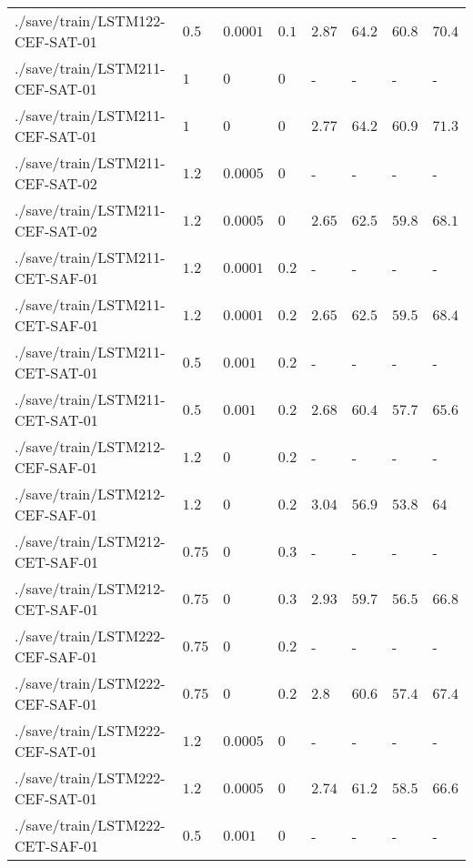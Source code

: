 \begin{table}[tbp]
\begin{tabular}{llllllll}
./save/train/LSTM122-CEF-SAT-01 & $0.5$ & $0.0001$ & $0.1$ & $2.87$ & $64.2$ & $60.8$ & $70.4$ \\
./save/train/LSTM211-CEF-SAT-01 & $1$ & $0$ & $0$ & - & - & - & - \\
./save/train/LSTM211-CEF-SAT-01 & $1$ & $0$ & $0$ & $2.77$ & $64.2$ & $60.9$ & $71.3$ \\
./save/train/LSTM211-CEF-SAT-02 & $1.2$ & $0.0005$ & $0$ & - & - & - & - \\
./save/train/LSTM211-CEF-SAT-02 & $1.2$ & $0.0005$ & $0$ & $2.65$ & $62.5$ & $59.8$ & $68.1$ \\
./save/train/LSTM211-CET-SAF-01 & $1.2$ & $0.0001$ & $0.2$ & - & - & - & - \\
./save/train/LSTM211-CET-SAF-01 & $1.2$ & $0.0001$ & $0.2$ & $2.65$ & $62.5$ & $59.5$ & $68.4$ \\
./save/train/LSTM211-CET-SAT-01 & $0.5$ & $0.001$ & $0.2$ & - & - & - & - \\
./save/train/LSTM211-CET-SAT-01 & $0.5$ & $0.001$ & $0.2$ & $2.68$ & $60.4$ & $57.7$ & $65.6$ \\
./save/train/LSTM212-CEF-SAF-01 & $1.2$ & $0$ & $0.2$ & - & - & - & - \\
./save/train/LSTM212-CEF-SAF-01 & $1.2$ & $0$ & $0.2$ & $3.04$ & $56.9$ & $53.8$ & $64$ \\
./save/train/LSTM212-CET-SAF-01 & $0.75$ & $0$ & $0.3$ & - & - & - & - \\
./save/train/LSTM212-CET-SAF-01 & $0.75$ & $0$ & $0.3$ & $2.93$ & $59.7$ & $56.5$ & $66.8$ \\
./save/train/LSTM222-CEF-SAF-01 & $0.75$ & $0$ & $0.2$ & - & - & - & - \\
./save/train/LSTM222-CEF-SAF-01 & $0.75$ & $0$ & $0.2$ & $2.8$ & $60.6$ & $57.4$ & $67.4$ \\
./save/train/LSTM222-CEF-SAT-01 & $1.2$ & $0.0005$ & $0$ & - & - & - & - \\
./save/train/LSTM222-CEF-SAT-01 & $1.2$ & $0.0005$ & $0$ & $2.74$ & $61.2$ & $58.5$ & $66.6$ \\
./save/train/LSTM222-CET-SAF-01 & $0.5$ & $0.001$ & $0$ & - & - & - & - \\
\hline
\end{tabular}
\end{table}

